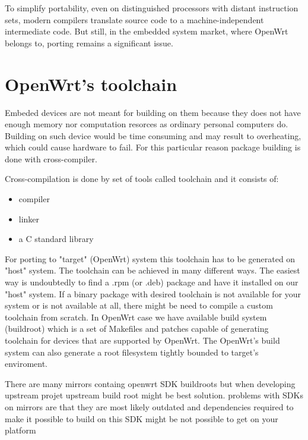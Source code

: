 To simplify portability, even on distinguished processors with distant instruction sets, modern compilers translate source code to a machine-independent intermediate code.
But still, in the embedded system market, where OpenWrt belongs to, porting remains a significant issue.

\section{OpenWrt's toolchain} %

Embeded devices are not meant for building on them because they does not have enough memory nor computation resorces as ordinary personal computers do.
Building on such device would be time consuming and may result to overheating, which could cause hardware to fail.
For this particular reason package building is done with cross-compiler.

Cross-compilation is done by set of tools called toolchain and it consists of:

\begin{itemize}
    \item compiler
    \item linker
    \item a C standard library
\end{itemize}

For porting to "target" (OpenWrt) system this toolchain has to be generated on "host" system.
The toolchain can be achieved in many different ways.
The easiest way is undoubtedly to find a .rpm (or .deb) package and have it installed on our "host" system.
If a binary package with desired toolchain is not available for your system or is not available at all, there might be need to compile a custom toolchain from scratch.%
In OpenWrt case we have available build system (buildroot) which is a set of Makefiles and patches capable of generating toolchain for devices that are supported by OpenWrt.
The OpenWrt's build system can also generate a root filesystem tightly bounded to target's enviroment.

There are many mirrors containg openwrt SDK buildroots but when developing upstream projet upstream build root might be best solution.
problems with SDKs on mirrors are that they are most likely outdated and dependencies required to make it possible to build on this SDK might be not possible to get on your platform


